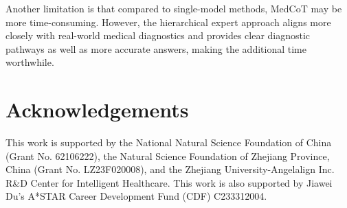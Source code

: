 \documentclass[11pt]{article}
\begin{document}
Another limitation is that compared to single-model methods, MedCoT may be more time-consuming. However, the hierarchical expert approach aligns more closely with real-world medical diagnostics and provides clear diagnostic pathways as well as more accurate answers, making the additional time worthwhile.
\section*{Acknowledgements}
This work is supported by the National Natural Science Foundation of China (Grant No. 62106222), the Natural Science Foundation of Zhejiang Province, China (Grant No. LZ23F020008), and the Zhejiang University-Angelalign Inc. R\&D Center for Intelligent Healthcare.
This work is also supported by Jiawei Du’s A*STAR Career Development Fund (CDF) C233312004.


\end{document}

